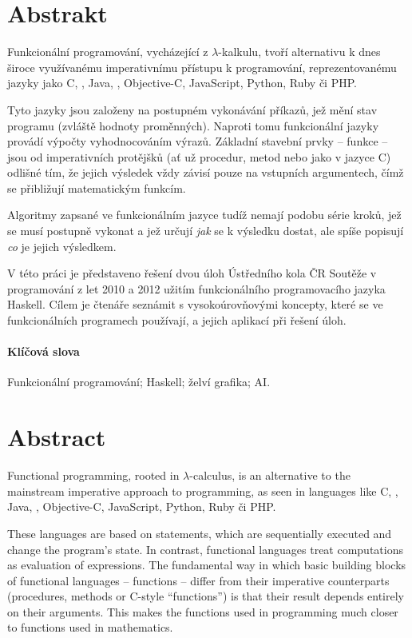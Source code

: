 \begin{adjustwidth}{1.5cm}{1.5cm}


\section*{Abstrakt}

Funkcionální programování, vycházející z $\lambda$-kalkulu, tvoří alternativu k
dnes široce využívanému imperativnímu přístupu k programování, reprezentovanému
jazyky jako C, \Cplusplus{}, Java, \Csh{}, Objective-C, JavaScript, Python, Ruby
či PHP.

Tyto jazyky jsou založeny na postupném vykonávání příkazů, jež mění stav
programu (zvláště hodnoty proměnných). Naproti tomu funkcionální jazyky provádí
výpočty vyhodnocováním výrazů. Základní stavební prvky -- funkce -- jsou od
imperativních protějšků (ať už procedur, metod nebo  jako v jazyce C)
odlišné tím, že jejich výsledek vždy závisí pouze na vstupních argumentech, čímž
se přibližují matematickým funkcím.

Algoritmy zapsané ve funkcionálním jazyce tudíž nemají podobu série kroků, jež
se musí postupně vykonat a jež určují \emph{jak} se k výsledku dostat, ale spíše
popisují \emph{co} je jejich výsledkem.

V této práci je představeno řešení dvou úloh Ústředního kola ČR Soutěže v
programování z let 2010 a 2012 užitím funkcionálního programovacího jazyka
Haskell. Cílem je čtenáře seznámit s vysokoúrovňovými koncepty, které se ve
funkcionálních programech používají, a jejich aplikací při řešení
 úloh.

\paragraph*{Klíčová slova}
Funkcionální programování; Haskell; želví grafika; AI.

\section*{Abstract}

Functional programming, rooted in $\lambda$-calculus, is an alternative to the
mainstream imperative approach to programming, as seen in languages like C,
\Cplusplus{}, Java, \Csh{}, Objective-C, JavaScript, Python, Ruby či PHP.

These languages are based on statements, which are sequentially executed and
change the program's state. In contrast, functional languages treat computations
as evaluation of expressions. The fundamental way in which basic building blocks
of functional languages -- functions -- differ from their imperative
counterparts (procedures, methods or C-style ``functions'') is that their result
depends entirely on their arguments. This makes the functions used in
programming much closer to functions used in mathematics.


\end{adjustwidth}
